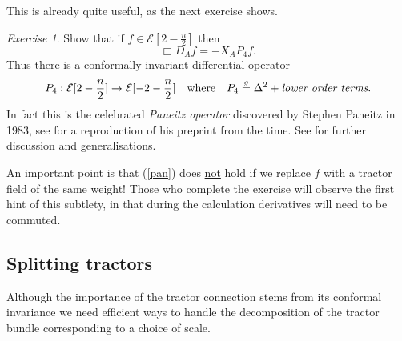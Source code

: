 \documentclass[a4paper,12pt]{amsart}
\def\Cal{\mathcal}
\newcommand{\ce}{{\Cal E}}
\theoremstyle{remark}
\newcommand{\nn}[1]{(\ref{#1})}
\newtheorem{exe}{Exercise}
\begin{document}
This is already quite useful, as the next exercise shows.
\begin{exe}
Show that if $f\in\ce[2-\frac{n}{2}]$ then 
\begin{equation}\label{pan}
\Box D_A f=-X_A P_4 f .
\end{equation}
Thus there is a conformally invariant differential operator 
$$
P_4 :\ce[2-\frac{n}{2}]\to \ce[-2-\frac{n}{2}] \quad\mbox{where}\quad P_4\stackrel{g}{=}\Delta^2+ \mbox{\it{lower order terms}}.  
$$ 
In fact this is the celebrated {\em Paneitz operator}
discovered by Stephen Paneitz in 1983, see \cite{PanSIGMA} for a
reproduction of his preprint from the time. See  \cite{Go-srni1,GoPet-Lap} for further discussion and generalisations.
\end{exe}
An important point is that \nn{pan} does \underline{not} hold if we
replace $f$ with a tractor field of the same weight! Those who 
complete the exercise will observe the first hint of
this subtlety, in that during the calculation derivatives will need to
be commuted.




\subsection{Splitting tractors}\label{splitt} 
Although the importance of the tractor connection stems from its
conformal invariance we need efficient ways to handle the decomposition of the
tractor bundle corresponding to a choice of scale.
\end{document}
